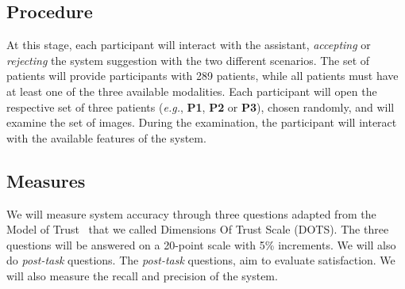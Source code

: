 \subsection{Procedure}
\label{sec:sec00404}

At this stage, each participant will interact with the assistant, {\it accepting} or {\it rejecting} the system suggestion with the two different scenarios.
The set of patients will provide participants with 289 patients, while all patients must have at least one of the three available modalities.
Each participant will open the respective set of three patients ({\it e.g.}, {\bf P1}, {\bf P2} or {\bf P3}), chosen randomly, and will examine the set of images.
During the examination, the participant will interact with the available features of the system.

\subsection{Measures}
\label{sec:sec00405}

We will measure system accuracy through three questions adapted from the Model of Trust~\cite{schoorman2016perspective} that we called Dimensions Of Trust Scale (DOTS).
The three questions will be answered on a 20-point scale with 5\% increments.
We will also do {\it post-task} questions.
The {\it post-task} questions, aim to evaluate satisfaction.
We will also measure the recall and precision of the system.

\break